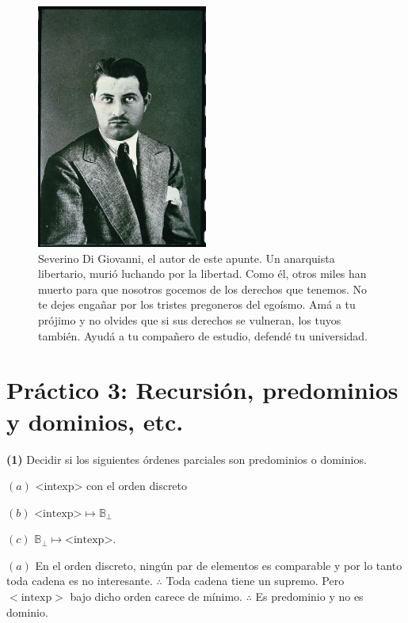 \documentclass[a4paper, 12pt]{article}
\begin{document}
 \begin{figure}[h!]
 \centering
  \includegraphics[width=0.5\textwidth]{../Images/SeverinoDiGiovanni.jpg}
 \caption{Severino Di Giovanni, el autor de este apunte. Un anarquista
   libertario, murió luchando por la libertad. Como él, otros miles han muerto
   para que nosotros gocemos de los derechos que tenemos. No te dejes engañar
   por los tristes pregoneros del egoísmo. Amá a tu prójimo y no olvides que si
   sus derechos se vulneran, los tuyos también. Ayudá a tu compañero de estudio,
 defendé tu universidad. }
 \end{figure}

\pagebreak
\tableofcontents
\newpage


\section{Práctico 3: Recursión, predominios y dominios, etc.}


\begin{myframe}
\textbf{(1)} Decidir si los siguientes órdenes parciales son predominios o
dominios.

$(a)$ <intexp> con el orden discreto

$(b)$ $\text{<intexp>} \mapsto
\mathbb{B}_{\bot}$

$(c)$ $\mathbb{B}_\bot \mapsto \text{<intexp>}$.
\end{myframe}

$(a)$ En el orden discreto, ningún par de elementos es comparable y por lo tanto
toda cadena es no interesante. $\therefore $ Toda cadena tiene un supremo. Pero
$<\text{intexp}>$ bajo dicho orden carece de mínimo. $\therefore $ Es
predominio y no es dominio.
\end{document}
